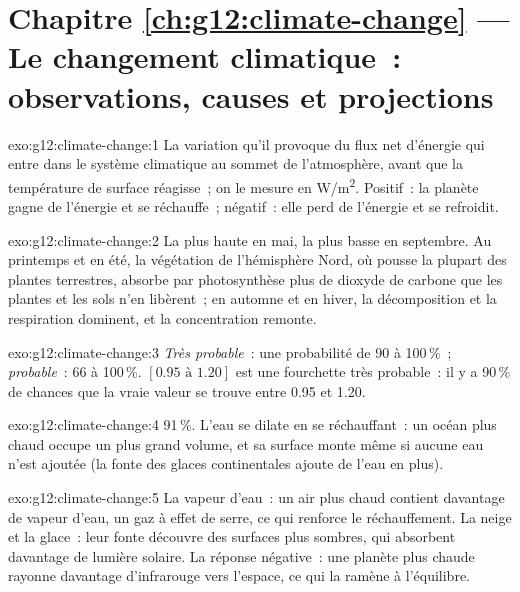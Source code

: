 \section*{Chapitre \ref{ch:g12:climate-change} --- Le changement climatique~: observations, causes et projections}

\begin{solution}{exo:g12:climate-change:1}
La variation qu'il provoque du flux net d'énergie qui entre dans le système
climatique au sommet de l'atmosphère, avant que la température de surface
réagisse~; on le mesure en \unit{W/m^2}. Positif~: la planète gagne de
l'énergie et se réchauffe~; négatif~: elle perd de l'énergie et se
refroidit.
\end{solution}

\begin{solution}{exo:g12:climate-change:2}
La plus haute en mai, la plus basse en septembre. Au printemps et en été,
la végétation de l'hémisphère Nord, où pousse la plupart des plantes
terrestres, absorbe par photosynthèse plus de dioxyde de carbone que les
plantes et les sols n'en libèrent~; en automne et en hiver, la
décomposition et la respiration dominent, et la concentration remonte.
\end{solution}

\begin{solution}{exo:g12:climate-change:3}
\emph{Très probable}~: une probabilité de 90 à 100\,\%~; \emph{probable}~:
66 à 100\,\%. $[0.95 \text{ à } 1.20]$ est une fourchette très probable~: il
y a 90\,\% de chances que la vraie valeur se trouve entre 0.95 et 1.20.
\end{solution}

\begin{solution}{exo:g12:climate-change:4}
91\,\%. L'eau se dilate en se réchauffant~: un océan plus chaud occupe un
plus grand volume, et sa surface monte même si aucune eau n'est ajoutée (la
fonte des glaces continentales ajoute de l'eau en plus).
\end{solution}

\begin{solution}{exo:g12:climate-change:5}
La vapeur d'eau~: un air plus chaud contient davantage de vapeur d'eau, un
gaz à effet de serre, ce qui renforce le réchauffement. La neige et la
glace~: leur fonte découvre des surfaces plus sombres, qui absorbent
davantage de lumière solaire. La réponse négative~: une planète plus chaude
rayonne davantage d'infrarouge vers l'espace, ce qui la ramène à
l'équilibre.
\end{solution}

